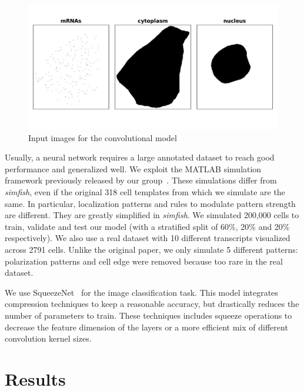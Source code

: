 \begin{figure}[h]
    \centering
    \includegraphics[width=\textwidth]{figures/appendix/surface_layers}
    \caption{Input images for the convolutional model}
    \label{fig:surface_layers}
\end{figure}

Usually, a neural network requires a large annotated dataset to reach good performance and generalized well.
We exploit the MATLAB simulation framework previously released by our group~\cite{samacoits_computational_2018}.
These simulations differ from \emph{simfish}, even if the original 318 cell templates from which we simulate are the same.
In particular, localization patterns and rules to modulate pattern strength are different.
They are greatly simplified in \emph{simfish}.
We simulated 200,000 cells to train, validate and test our model (with a stratified split of 60\%, 20\% and 20\% respectively).
We also use a real dataset with 10 different transcripts visualized across 2791 cells.
Unlike the original paper, we only simulate 5 different patterns: polarization patterns and cell edge were removed because too rare in the real dataset.

We use SqueezeNet~\cite{Iandola_2016} for the image classification task.
This model integrates compression techniques to keep a reasonable accuracy, but drastically reduces the number of parameters to train.
These techniques includes squeeze operations to decrease the feature dimension of the layers or a more efficient mix of different convolution kernel sizes.

\section{Results}
\label{sec:results_cnn_features}

